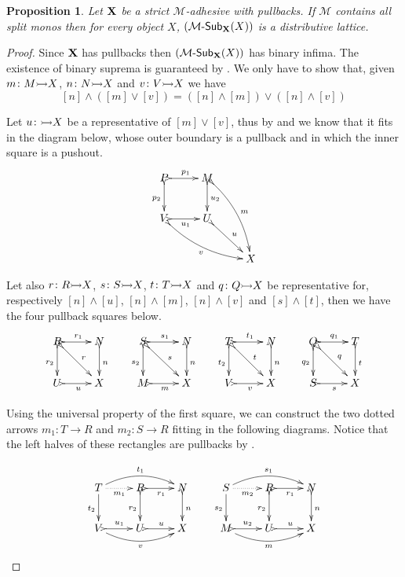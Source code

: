 \documentclass[a4paper]{article}
\newcommand{\sub}[3]{{\mathcal{#1}}\textrm{-}\mathsf{Sub}_{\textbf {\textup{#2}}}(#3)}
\newcommand{\mto}[0]{\scalebox{1}{$\rightarrowtail$}}
\def\X{\textbf {\textup{X}}}
\newtheorem{proposition}[theorem]{Proposition}
\theoremstyle{definition}
\begin{document}
 
 \begin{proposition}\label{prop:distlat}Let $\X$ be a strict $\mathcal{M}$-adhesive with pullbacks. If $\mathcal{M}$ contains all split monos then for every object $X$, $(\sub{M}{X}{X})$ is a distributive lattice. 
 \end{proposition}
\begin{proof}
	Since $\X$ has pullbacks then $(\sub{M}{X}{X})$  has binary infima. The existence of binary suprema is guaranteed by . We only have to show that, given $m\colon M\mto X$, $n\colon N\mto X$ and $v\colon V\mto X$ we have
	\[[n]\wedge ([m]\vee[v])=([n]\wedge [m]) \vee ([n]\wedge [v])\]
	
	Let $u\colon \mto X$ be a representative of $[m]\vee [v]$, thus by  and  we know that it fits in the diagram below, whose outer boundary is a pullback and in which the inner square is a pushout.
		\[\xymatrix{P \ar@{>->}[r]^{p_1} \ar@{>->}[d]_{p_2} & M\ar@{>->}[d]^{u_2} \ar@{>->}@/^.3cm/[ddr]^{m} \\ V \ar@{>->}@/_.3cm/[drr]_{v}\ar@{>->}[r]_{u_1} & U \ar@{>->}[dr]^{u} \\ && X}\]
		
	Let also $r\colon R\mto X$,  $s\colon S\mto X$, $t\colon T\mto X$ and $q\colon Q\mto X$ be  representative for, respectively $[n]\wedge [u]$, $[n]  \wedge [m]$, $[n]\wedge [v]$ and $[s]\wedge [t]$,  then we have the four pullback squares below.
	\[\xymatrix{R \ar@{>->}[r]^{r_1} \ar@{>->}[d]_{r_2}\ar@{>->}[dr]^{r}& N \ar@{>->}[d]^{n} & S \ar@{>->}[r]^{s_1} \ar@{>->}[d]_{s_2}\ar@{>->}[dr]^{s}& N \ar@{>->}[d]^{n}&T \ar@{>->}[r]^{t_1} \ar@{>->}[d]_{t_2}\ar@{>->}[dr]^{t}& N \ar@{>->}[d]^{n}& Q \ar@{>->}[r]^{q_1} \ar@{>->}[d]_{q_2}\ar@{>->}[dr]^{q}& T \ar@{>->}[d]^{t}\\U \ar@{>->}[r]_{u} & X&M \ar@{>->}[r]_{m} & X&V \ar@{>->}[r]_{v} & X&S \ar@{>->}[r]_{s} & X}\]
	
Using the universal property of the first square, we can construct the two dotted arrows $m_1\colon T\to R$ and $m_2\colon S\to R$ fitting in the following diagrams. Notice that the left halves of these rectangles are pullbacks by .

\[\xymatrix{T \ar[d]_{t_2} \ar@/^.4cm/[rr]^{t_1} \ar@{.>}[r]_{m_1}& R \ar@{>->}[r]_{r_1} \ar@{>->}[d]_{r_2}& N \ar@{>->}[d]^{n} & S \ar[d]_{s_2} \ar@/^.4cm/[rr]^{s_1} \ar@{.>}[r]_{m_2}& R \ar@{>->}[r]_{r_1} \ar@{>->}[d]_{r_2}& N \ar@{>->}[d]^{n}\\ V \ar@/_.4cm/[rr]_{v} \ar@{>->}[r]^{u_1}&U \ar@{>->}[r]^{u} & X &  M \ar@/_.4cm/[rr]_{m} \ar@{>->}[r]^{u_2}&U \ar@{>->}[r]^{u} & X}\] 


\end{proof}
\end{document}
